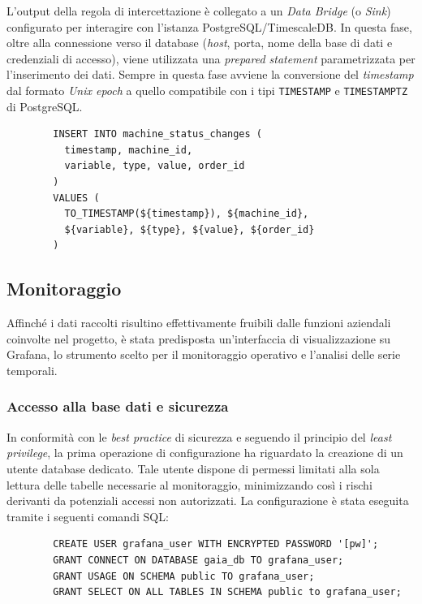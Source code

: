 \documentclass[12pt]{article}
\begin{document}
    L'output della regola di intercettazione è collegato a un \textit{Data Bridge} (o \textit{Sink}) configurato per interagire con l'istanza PostgreSQL/TimescaleDB.  In questa fase, oltre alla connessione verso il database (\textit{host}, porta, nome della base di dati e credenziali di accesso), viene utilizzata una \textit{prepared statement} parametrizzata per l'inserimento dei dati. Sempre in questa fase avviene la conversione del \textit{timestamp} dal formato \textit{Unix epoch} a quello compatibile con i tipi \verb|TIMESTAMP| e \verb|TIMESTAMPTZ| di PostgreSQL.
    
    \begin{verbatim}
        INSERT INTO machine_status_changes (
          timestamp, machine_id, 
          variable, type, value, order_id
        ) 
        VALUES (
          TO_TIMESTAMP(${timestamp}), ${machine_id}, 
          ${variable}, ${type}, ${value}, ${order_id}
        )
    \end{verbatim}

    \subsection{Monitoraggio}

    Affinché i dati raccolti risultino effettivamente fruibili dalle funzioni aziendali coinvolte nel progetto, è stata predisposta un'interfaccia di visualizzazione su Grafana, lo strumento scelto per il monitoraggio operativo e l'analisi delle serie temporali.
    
    \subsubsection{Accesso alla base dati e sicurezza}
    
    In conformità con le \textit{best practice} di sicurezza e seguendo il principio del \textit{least privilege}, la prima operazione di configurazione ha riguardato la creazione di un utente database dedicato. Tale utente dispone di permessi limitati alla sola lettura delle tabelle necessarie al monitoraggio, minimizzando così i rischi derivanti da potenziali accessi non autorizzati. La configurazione è stata eseguita tramite i seguenti comandi SQL:
    
    \begin{verbatim}
        CREATE USER grafana_user WITH ENCRYPTED PASSWORD '[pw]';
        GRANT CONNECT ON DATABASE gaia_db TO grafana_user;
        GRANT USAGE ON SCHEMA public TO grafana_user;
        GRANT SELECT ON ALL TABLES IN SCHEMA public to grafana_user;
    \end{verbatim}
    
\end{document}
